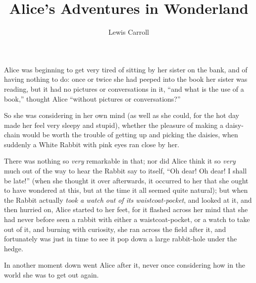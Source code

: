 \documentclass[book, 20pt]{extbook}
\begin{document}
\title{Alice's Adventures in Wonderland}
\author{Lewis Carroll}
\date{ }

\setmainfont[renderder=basic]{EB Garamond}

\pagestyle{fancy}
\fancyhead{}
\renewcommand{\headrulewidth}{0pt}

\pagestyle{empty}
\maketitle
\tableofcontents
\thispagestyle{empty}

\raggedright
\setlength{\parindent}{1cm}
\setlength{\parskip}{0pt}

\chapter*{}
\pagestyle{plain}

Alice was beginning to get very tired of sitting by her sister on the
bank, and of having nothing to do: once or twice she had peeped into the
book her sister was reading, but it had no pictures or conversations in
it, ``and what is the use of a book,'' thought Alice ``without pictures
or conversations?''

So she was considering in her own mind (as well as she could, for the
hot day made her feel very sleepy and stupid), whether the pleasure of
making a daisy-chain would be worth the trouble of getting up and
picking the daisies, when suddenly a White Rabbit with pink eyes ran
close by her.

There was nothing so \emph{very} remarkable in that; nor did Alice think
it so \emph{very} much out of the way to hear the Rabbit say to itself,
``Oh dear! Oh dear! I shall be late!'' (when she thought it over
afterwards, it occurred to her that she ought to have wondered at this,
but at the time it all seemed quite natural); but when the Rabbit
actually \emph{took a watch out of its waistcoat-pocket}, and looked at
it, and then hurried on, Alice started to her feet, for it flashed
across her mind that she had never before seen a rabbit with either a
waistcoat-pocket, or a watch to take out of it, and burning with
curiosity, she ran across the field after it, and fortunately was just
in time to see it pop down a large rabbit-hole under the hedge.

In another moment down went Alice after it, never once considering how
in the world she was to get out again.
\end{document}
